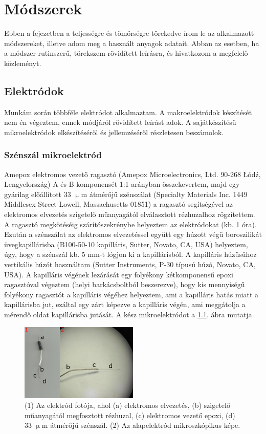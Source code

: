 \chapter{Módszerek}
\pagestyle{headings}

Ebben a fejezetben a teljességre és tömörségre törekedve írom le az alkalmazott módszereket, illetve adom meg a használt anyagok adatait. Abban az esetben, ha a módszer rutinszerű, törekszem rövidített leírásra, és hivatkozom a megfelelő közleményt.

\section{Elektródok}

Munkám során többféle elektródot alkalmaztam. A makroelektródok készítését nem én végeztem, ennek módjáról rövidített leírást adok. A sajátkészítésű mikroelektródok elkészítéséről és jellemzéséről részletesen beszámolok.

\subsection{Szénszál mikroelektród}
Amepox elektromos vezető ragasztó (Amepox Microelectronics, Ltd. 90-268 Łódź, Lengyelország) A és B komponensét 1:1 arányban összekevertem, majd egy gyárilag előállított 33 $\upmu$m átmérőjű szénszálat (Specialty Materials Inc. 1449 Middlesex Street Lowell, Massachusetts 01851) a ragasztó segítségével az elektromos elvezetés szigetelő műanyagától elválasztott rézhuzalhoz rögzítettem. A ragasztó megkötéséig szárítószekrénybe helyeztem az elektródokat (kb. 1 óra). Ezután a szénszálat az elektromos elvezetéssel együtt egy húzott végű boroszilikát üvegkapillárisba (B100-50-10 kapilláris, Sutter, Novato, CA, USA) helyeztem, úgy, hogy a szénszál kb. 5 mm-t lógjon ki a kapillárisból. A kapilláris húzűsűhoz vertikális húzót használtam (Sutter Instruments, P-30 típusú húzó, Novato, CA, USA). A kapilláris végének lezárását egy folyékony kétkomponensű epoxi ragasztóval végeztem (helyi barkácsboltból beszerezve), hogy kis mennyiségű folyékony ragasztót a kapilláris végéhez helyeztem, ami a kapilláris hatás miatt a kapillárisba jut, ezáltal egy zárt képezve a kapilláris végén, ami meggátolja a mérendő oldat kapillárisba jutását. A kész mikroelektródot a \ref{fig:szen33}. ábra mutatja.
\begin{figure}
\centering
\includegraphics[width=0.5\textwidth]{img/szen33.png}
\caption{(1) Az elektród fotója, ahol (a) elektromos elvezetés, (b) szigetelő műanyagától megfosztott rézhuzal, (c) elektromos vezető epoxi, (d) 33 $\upmu$m átmérőjű szénszál. (2) Az alapelektród mikroszkópikus képe.}
\label{fig:szen33}
\end{figure}

